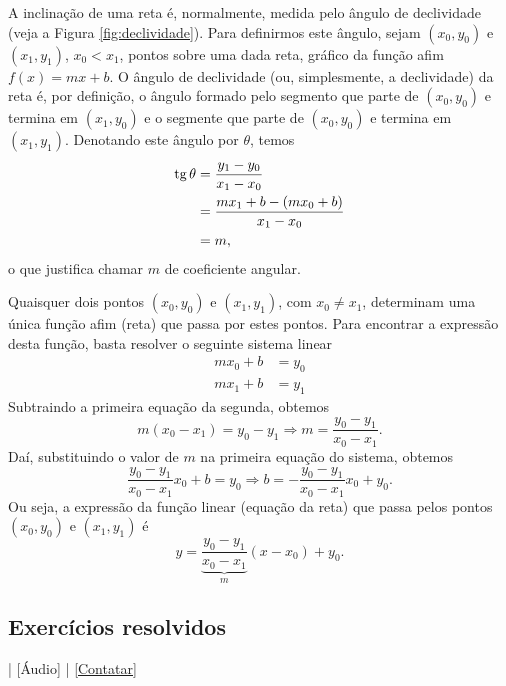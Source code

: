 A inclinação de uma reta é, normalmente, medida pelo ângulo de declividade (veja a Figura \ref{fig:declividade}). Para definirmos este ângulo, sejam $(x_0, y_0)$ e $(x_1, y_1)$, $x_0<x_1$, pontos sobre uma dada reta, gráfico da função afim $f(x)=mx+b$. O ângulo de declividade (ou, simplesmente, a declividade) da reta é, por definição, o ângulo formado pelo segmento que parte de $(x_0, y_0)$ e termina em $(x_1, y_0)$ e o segmente que parte de $(x_0, y_0)$ e termina em $(x_1, y_1)$. Denotando este ângulo por $\theta$, temos
\begin{align}
  \operatorname{tg}\theta &= \frac{y_1-y_0}{x_1-x_0}\\
            &= \frac{mx_1+b-(mx_0+b)}{x_1-x_0}\\
            &= m,
\end{align}
o que justifica chamar $m$ de coeficiente angular.

Quaisquer dois pontos $(x_0, y_0)$ e $(x_1, y_1)$, com $x_0\neq x_1$, determinam uma única função afim (reta) que passa por estes pontos. Para encontrar a expressão desta função, basta resolver o seguinte sistema linear
\begin{align}
  mx_0 + b &= y_0\\
  mx_1 + b &= y_1
\end{align}
Subtraindo a primeira equação da segunda, obtemos
\begin{equation}
  m(x_0-x_1) = y_0-y_1 \Rightarrow m = \frac{y_0-y_1}{x_0-x_1}.
\end{equation}
Daí, substituindo o valor de $m$ na primeira equação do sistema, obtemos
\begin{equation}
  \frac{y_0-y_1}{x_0-x_1}x_0 + b = y_0 \Rightarrow b = -\frac{y_0-y_1}{x_0-x_1}x_0 + y_0.
\end{equation}
Ou seja, a expressão da função linear (equação da reta) que passa pelos pontos $(x_0, y_0)$ e $(x_1, y_1)$ é
\begin{equation}\label{eq:funafim_eq}
  y = \underbrace{\frac{y_0-y_1}{x_0-x_1}}_{m}(x-x_0) + y_0.
\end{equation}

\subsection*{Exercícios resolvidos}

\begin{flushright}
  [Vídeo] | [Áudio] | \href{https://phkonzen.github.io/notas/contato.html}{[Contatar]}
\end{flushright}

